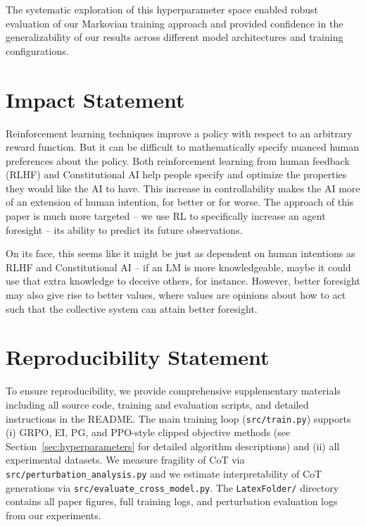 \documentclass{article}
\begin{document}
The systematic exploration of this hyperparameter space enabled robust evaluation of our Markovian training approach and provided confidence in the generalizability of our results across different model architectures and training configurations.


\section{Impact Statement}
\label{sec:ethics}
Reinforcement learning techniques improve a policy with respect to an arbitrary reward function. But it can be difficult to mathematically specify nuanced human preferences about the policy. Both reinforcement learning from human feedback (RLHF) \citep{christiano2023deepreinforcementlearninghuman} and Constitutional AI \citep{bai2022constitutional} help people specify and optimize the properties they would like the AI to have. This increase in controllability makes the AI more of an extension of human intention, for better or for worse. The approach of this paper is much more targeted -- we use RL to specifically increase an agent foresight -- its ability to predict its future observations. 

On its face, this seems like it might be just as dependent on human intentions as RLHF and Constitutional AI -- if an LM is more knowledgeable, maybe it could use that extra knowledge to deceive others, for instance. However, better foresight may also give rise to better values, where values are opinions about how to act such that the collective system can attain better foresight.

\section{Reproducibility Statement}
To ensure reproducibility, we provide comprehensive supplementary materials including all source code, training and evaluation scripts, and detailed instructions in the README. The main training loop (\texttt{src/train.py}) supports (i) GRPO, EI, PG, and PPO-style clipped objective methods (see Section~\ref{sec:hyperparameters} for detailed algorithm descriptions) and (ii) all experimental datasets. We measure fragility of CoT via \texttt{src/perturbation\_analysis.py} and we estimate interpretability of CoT generations via \texttt{src/evaluate\_cross\_model.py}. The \texttt{LatexFolder/} directory contains all paper figures, full training logs, and perturbation evaluation logs from our experiments.
\end{document}
